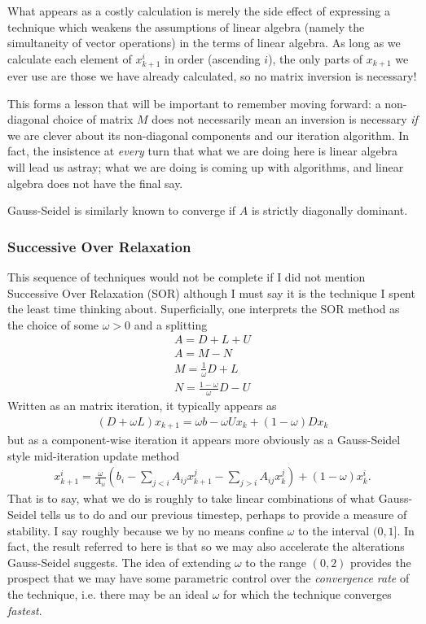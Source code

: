\documentclass[11pt]{article}
\begin{document}
What appears as a costly calculation is merely the side effect of expressing a technique which weakens the assumptions of linear algebra (namely the simultaneity of vector operations) in the terms of linear algebra. As long as we calculate each element of $x_{k+1}^i$ in order (ascending $i$), the only parts of $x_{k+1}$ we ever use are those we have already calculated, so no matrix inversion is necessary!

This forms a lesson that will be important to remember moving forward: a non-diagonal choice of matrix $M$ does not necessarily mean an inversion is necessary \emph{if} we are clever about its non-diagonal components and our iteration algorithm. In fact, the insistence at \emph{every} turn that what we are doing here is linear algebra will lead us astray; what we are doing is coming up with algorithms, and linear algebra does not have the final say.

Gauss-Seidel is similarly known to converge if $A$ is strictly diagonally dominant.

\subsubsection{Successive Over Relaxation}

This sequence of techniques would not be complete if I did not mention Successive Over Relaxation (SOR) although I must say it is the technique I spent the least time thinking about. Superficially, one interprets the SOR method as the choice of some $\omega > 0$ and a splitting \begin{gather*}
A = D + L + U \\
A = M - N \\
M = \frac{1}{\omega}D + L \\
N = \frac{1-\omega}{\omega} D - U 
\end{gather*}
Written as an matrix iteration, it typically appears as \begin{gather*}
(D + \omega L) x_{k+1} = \omega b  - \omega U x_k + (1 - \omega) D x_k
\end{gather*}
but as a component-wise iteration it appears more obviously as a Gauss-Seidel style mid-iteration update method \begin{gather*}
x_{k+1}^ i = \frac{\omega}{A_{ii}} \left(b_i - \sum_{j < i} A_{ij} x^j_{k+1} - \sum_{j > i} A_{ij} x^j_{k} \right) + (1 - \omega) x_k^i.
\end{gather*}
That is to say, what we do is roughly to take linear combinations of what Gauss-Seidel tells us to do and our previous timestep, perhaps to provide a measure of stability. I say roughly because we by no means confine $\omega$ to the interval $(0,1]$. In fact, the result referred to here is that  so we may also accelerate the alterations Gauss-Seidel suggests. The idea of extending $\omega$ to the range $(0,2)$ provides the prospect that we may have some parametric control over the \emph{convergence rate} of the technique, i.e. there may be an ideal $\omega$ for which the technique converges \emph{fastest}.
\end{document}
